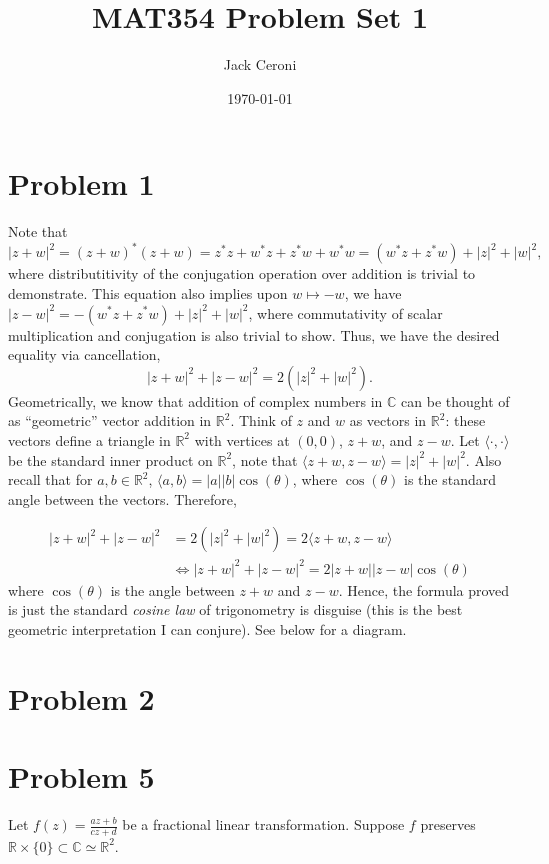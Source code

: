 \documentclass[aps,pra,showpacs,notitlepage,onecolumn,superscriptaddress,nofootinbib]{revtex4-1}
\theoremstyle{definition}
\begin{document}
\title{MAT354 Problem Set 1}
\author{Jack Ceroni}

\date{\today}

\maketitle

\section{Problem 1}

\noindent Note that
\begin{equation}
  |z + w|^2 = (z + w)^{*} (z + w) = z^{*} z + w^{*} z + z^{*} w + w^{*} w = (w^{*} z + z^{*} w) + |z|^2 + |w|^2,
\end{equation}
where distributitivity of the conjugation operation over addition is trivial to demonstrate. This equation also implies upon $w \mapsto -w$,
we have $|z - w|^2 = -(w^{*} z + z^{*} w) + |z|^2 + |w|^2$, where commutativity of scalar multiplication and conjugation is also trivial to show.
Thus, we have the desired equality via cancellation,
\begin{equation}
  |z + w|^2 + |z - w|^2 = 2(|z|^2 + |w|^2).
\end{equation}
Geometrically, we know that addition of complex numbers in $\mathbb{C}$ can be thought of as ``geometric'' vector addition in $\mathbb{R}^2$. Think of $z$
and $w$ as vectors in $\mathbb{R}^2$: these vectors define a triangle in $\mathbb{R}^2$ with vertices at $(0, 0)$, $z + w$, and $z - w$. Let
$\langle \cdot, \cdot \rangle$ be the standard inner product on $\mathbb{R}^2$, note that $\langle z + w, z - w \rangle = |z|^2 + |w|^2$. Also recall that for $a, b \in \mathbb{R}^2$,
$\langle a, b \rangle = |a| |b| \cos(\theta)$, where $\cos(\theta)$ is the standard angle between the vectors. Therefore,

\begin{align}
  |z + w|^2 + |z - w|^2 &= 2 (|z|^2 + |w|^2) = 2 \langle z + w, z - w \rangle
  \\ &\Longleftrightarrow |z + w|^2 + |z - w|^2 = 2 |z + w| |z - w| \cos(\theta)
\end{align}
where $\cos(\theta)$ is the angle between $z + w$ and $z - w$. Hence, the formula proved is just the standard \emph{cosine law} of trigonometry is disguise (this
is the best geometric interpretation I can conjure). See below for a diagram.

\section{Problem 2}

\section{Problem 5}

Let $f(z) = \frac{az + b}{cz + d}$ be a fractional linear transformation. Suppose $f$ preserves $\mathbb{R} \times \{0\} \subset \mathbb{C} \simeq \mathbb{R}^2$.
\end{document}
